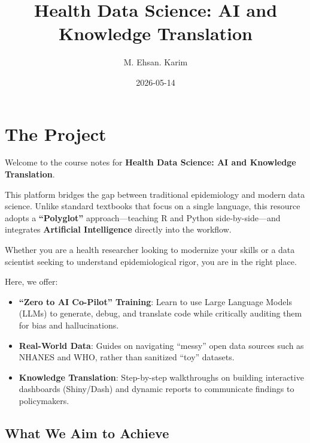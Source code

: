 \documentclass[
  letterpaper,
  DIV=11,
  numbers=noendperiod,
  oneside]{scrreprt}
\title{Health Data Science: AI and Knowledge Translation}
\author{M. Ehsan. Karim}
\date{2026-05-14}
\providecommand{\tightlist}{%
  \setlength{\itemsep}{0pt}\setlength{\parskip}{0pt}}
\renewcommand*\contentsname{Table of contents}
\newcommand\contentsname{Table of contents}
\begin{document}
\maketitle

\renewcommand*\contentsname{Table of contents}
{
\hypersetup{linkcolor=}
\setcounter{tocdepth}{1}
\tableofcontents
}


\chapter*{The Project}\label{the-project}


Welcome to the course notes for \textbf{Health Data Science: AI and
Knowledge Translation}.

This platform bridges the gap between traditional epidemiology and
modern data science. Unlike standard textbooks that focus on a single
language, this resource adopts a \textbf{``Polyglot''}
approach---teaching R and Python side-by-side---and integrates
\textbf{Artificial Intelligence} directly into the workflow.

Whether you are a health researcher looking to modernize your skills or
a data scientist seeking to understand epidemiological rigor, you are in
the right place.

Here, we offer:

\begin{itemize}
\tightlist
\item
  \textbf{``Zero to AI Co-Pilot'' Training}: Learn to use Large Language
  Models (LLMs) to generate, debug, and translate code while critically
  auditing them for bias and hallucinations.
\item
  \textbf{Real-World Data}: Guides on navigating ``messy'' open data
  sources such as NHANES and WHO, rather than sanitized ``toy''
  datasets.
\item
  \textbf{Knowledge Translation}: Step-by-step walkthroughs on building
  interactive dashboards (Shiny/Dash) and dynamic reports to communicate
  findings to policymakers.
\end{itemize}

\section*{What We Aim to Achieve}\label{what-we-aim-to-achieve}
\end{document}
